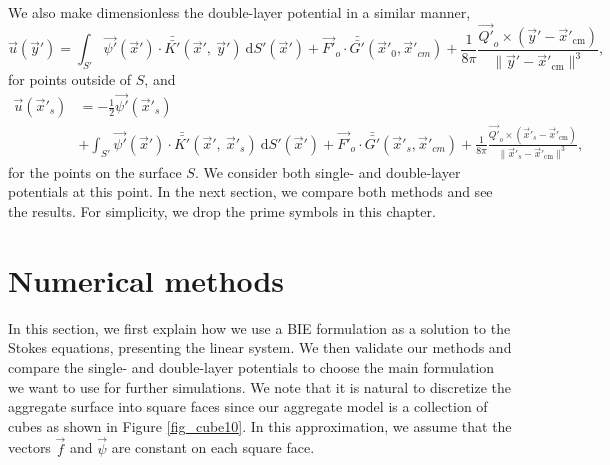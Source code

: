  We also make dimensionless the double-layer potential in a similar manner, 
 \begin{equation}
 \vec{u}(\vec{y}') = \int_{S'}
 \vec{\psi'}(\vec{x}') \cdot  \bar{\bar{K'}}(\vec{x}', \ \vec{y}')  \ \text{d}S' (\vec{x}') + \vec{F'}_o \cdot \bar{\bar{G'}}(\vec{x}'_{0},\vec{x}'_{cm})
 +\frac{1}{8 \pi} \frac{\vec{Q'}_o \times
 (\vec{y}'   - \vec{x}'_{\text{cm}} ) }{\| \vec{y}'   - \vec{x}'_{\text{cm}} \|^3 },
  \label{eq_BI_DL_noD}
 \end{equation}
 for points outside of $S$, and
 \begin{align}
 \vec{u}(\vec{x}'_s) 
 & =  -\frac{1}{2}\vec{\psi'}(\vec{x}'_s)
 \nonumber  \\
&+  \int_{S'}
 \vec{\psi'}(\vec{x}') \cdot  \bar{\bar{K'}}(\vec{x}', \ \vec{x}'_s)  \ \text{d}S' (\vec{x}') + \vec{F'}_o \cdot \bar{\bar{G'}}(\vec{x}'_{s},\vec{x}'_{cm})
 +\frac{1}{8 \pi} \frac{\vec{Q'}_o \times
 (\vec{x}'_s   - \vec{x}'_{\text{cm}} ) }{\| \vec{x}'_s   - \vec{x}'_{\text{cm}} \|^3 },
  \label{eq_BI_DL_jump_noD}
 \end{align}
 for the points on the surface $S$.
We consider both single- and double-layer potentials at this point. In the next section, we compare both methods and see the results. For simplicity, we drop the prime symbols in this chapter.
\section{Numerical methods}
In this section, we first explain how we use a BIE formulation as a solution to the Stokes equations, presenting the linear system. We then validate our methods and compare the single- and double-layer potentials to choose the main formulation we want to use for further simulations. We note that it is natural to discretize the aggregate surface into square faces since our aggregate model is a collection of cubes as shown in Figure \ref{fig_cube10}. In this approximation, we assume that the vectors $\vec{f}$ and $\vec{\psi}$ are constant on each square face.

